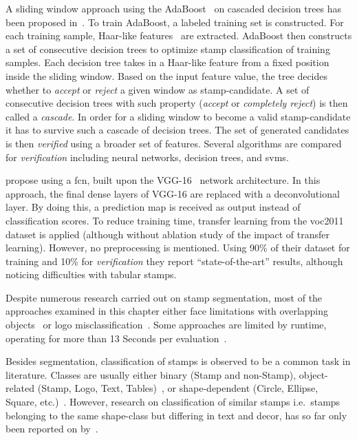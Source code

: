 \begin{description}[font={\color{red!50!black}\ttfamily}]
    A sliding window approach using the AdaBoost~\cite{Freund.1995} on cascaded
    decision trees has been proposed in~\cite{Forczmanski.2016}. To train 
    AdaBoost, a labeled training set is constructed. For each training 
    sample, Haar-like features~\cite{Viola.2001} are extracted. AdaBoost then
    constructs a set of consecutive decision trees to optimize stamp classification
    of training samples. Each decision tree takes in a Haar-like feature from 
    a fixed position inside the sliding window. Based on the input feature 
    value, the tree decides whether to \textit{accept} or \textit{reject} a
    given window as stamp-candidate. A set of consecutive decision trees
    with such property (\textit{accept} or \textit{completely reject}) is
    then called a \textit{cascade}. In order for a sliding window to become a valid
    stamp-candidate it has to survive such a cascade of decision trees. The
    set of generated candidates is then \textit{verified} using a broader set of features.
    Several algorithms are compared for \textit{verification} including neural
    networks, decision trees, and \glspl{svm}.

    \textcite{Younas.2017} propose using a \gls{fcn}, built upon the VGG-16~\cite{Simonyan.2015}
    network architecture. In this approach, the final \glspl{dense layer}
    of VGG-16 are replaced with a \gls{deconvolutional layer}. By doing this,
    a prediction map is received as output instead of classification scores.
    To reduce training time, transfer learning from the \gls{voc}2011 dataset is
    applied (although without ablation study of the impact of transfer learning).
    However, no preprocessing is mentioned. Using 90\% of their dataset for
    training and 10\% for \textit{verification} they report ``state-of-the-art''
    results, although noticing difficulties with tabular stamps.
\end{description}

Despite numerous research carried out on stamp segmentation, most of the 
approaches examined in this chapter either face limitations with overlapping 
objects~\cite{Nandedkar.2015, Nandedkar.2015b,Forczmanski.2016, Ahmed.2013, Dey.2015, 
Forczmanski.2015, Forczmanski.2016} or logo misclassification~\cite{Ahmed.2013,Dey.2015,Micenkova.2011}.
Some approaches are limited by runtime, operating for more than 13 Seconds per
evaluation~\cite{Ahmed.2016,Nandedkar.2015}.
\par
Besides segmentation, classification of stamps is observed to be a common task 
in literature. Classes are usually either binary (Stamp and non-Stamp), 
object-related (Stamp, Logo, Text, Tables)~\cite{Forczmanski.2016,
Nandedkar.2015, Nandedkar.2015b, Dey.2015},
or shape-dependent (Circle, Ellipse, Square, etc.)~\cite{Forczmanski.2015}.
However, research on classification of similar stamps i.e.\ stamps belonging to
the same shape-class but differing in text and decor, has so far only been
reported on by~\cite{Petej.2013}.